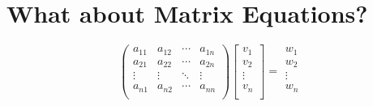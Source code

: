 \documentclass{article} %
\begin{document}
\section{What about Matrix Equations?\\} %
\[
\begin{pmatrix} %
a_{11} & a_{12} & \cdots & a_{1n} \\
a_{21} & a_{22} & \cdots & a_{2n} \\
\vdots & \vdots & \ddots & \vdots \\
a_{n1} & a_{n2} & \cdots & a_{nn} \\
\end{pmatrix}
\begin{bmatrix}			%
v_1 \\
v_2 \\
\vdots \\
v_n \\
\end{bmatrix}
=
\begin{matrix}		%
w_1 \\
w_2 \\
\vdots \\
w_n \\
\end{matrix}
\]
\end{document}

